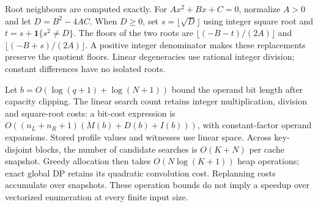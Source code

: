 Root neighbours are computed exactly. For $Ax^2+Bx+C=0$, normalize $A>0$
and let $D=B^2-4AC$. When $D\geq0$, set $s=\lfloor\sqrt D\rfloor$
using integer square root and $t=s+\mathbf1\{s^2\ne D\}$. The floors of
the two roots are $\lfloor(-B-t)/(2A)\rfloor$ and
$\lfloor(-B+s)/(2A)\rfloor$. A positive integer denominator makes these
replacements preserve the quotient floors. Linear degeneracies use rational
integer division; constant differences have no isolated roots.

Let $b=O(\log(q+1)+\log(N+1))$ bound the operand bit length after capacity
clipping. The linear search count retains integer multiplication, division
and square-root costs: a bit-cost expression is
$O((n_L+n_R+1)(M(b)+D(b)+I(b)))$, with constant-factor operand expansions.
Stored profile values and witnesses use linear space. Across key-disjoint
blocks, the number of candidate searches is $O(K+N)$ per cache snapshot.
Greedy allocation then takes $O(N\log(K+1))$ heap operations; exact global
DP retains its quadratic convolution cost. Replanning costs accumulate over
snapshots. These operation bounds do not imply a speedup over vectorized
enumeration at every finite input size.
